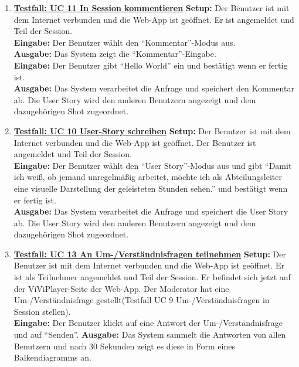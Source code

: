 \begin{enumerate}
	\item \underline{\textbf{Testfall: UC 11 In Session kommentieren}} \linebreak
	\textbf{Setup:} Der Benutzer ist mit dem Internet verbunden und die Web-App ist geöffnet. Er ist angemeldet und Teil der Session.\\
	\textbf{Eingabe:} Der Benutzer wählt den ``Kommentar''-Modus aus. \\
	\textbf{Ausgabe:} Das System zeigt die ``Kommentar''-Eingabe. \\
	\textbf{Eingabe:} Der Benutzer gibt ``Hello World'' ein und bestätigt wenn er fertig ist.\\
	\textbf{Ausgabe:} Das System verarbeitet die Anfrage und speichert den Kommentar ab. Die User Story wird den anderen Benutzern angezeigt und dem dazugehörigen Shot zugeordnet. \linebreak \linebreak \linebreak \linebreak
	
	\item \underline{\textbf{Testfall: UC 10 User-Story schreiben}} \linebreak
	\textbf{Setup:} Der Benutzer ist mit dem Internet verbunden und die Web-App ist geöffnet. Der Benutzer ist angemeldet und Teil der Session.\\
	\textbf{Eingabe:} Der Benutzer wählt den ``User Story''-Modus aus und gibt ``Damit ich weiß, ob jemand unregelmäßig arbeitet, möchte ich als Abteilungsleiter eine visuelle Darstellung der geleisteten Stunden sehen.'' und bestätigt wenn er fertig ist.\\
	\textbf{Ausgabe:} Das System verarbeitet die Anfrage und speichert die User Story ab. Die User Story wird den anderen Benutzern angezeigt und dem dazugehörigen Shot zugeordnet. \\
	
	\item \underline{\textbf{Testfall: UC 13 An Um-/Verständnisfragen teilnehmen}} \linebreak
	\textbf{Setup:} Der Benutzer ist mit dem Internet verbunden und die Web-App ist geöffnet. Er ist als Teilnehmer angemeldet und Teil der Session. Er befindet sich jetzt auf der ViViPlayer-Seite der Web-App. Der Moderator hat eine Um-/Verständnisfrage gestellt(Testfall UC 9 Um-/Verständnisfragen in Session stellen).\\
	\textbf{Eingabe:} Der Benutzer klickt auf eine Antwort der Um-/Verständnisfrage und auf ``Senden''.
	\textbf{Ausgabe:} Das System sammelt die Antworten von allen Benutzern und nach 30 Sekunden zeigt es diese in Form eines Balkendiagramms an.
	

\end{enumerate}
